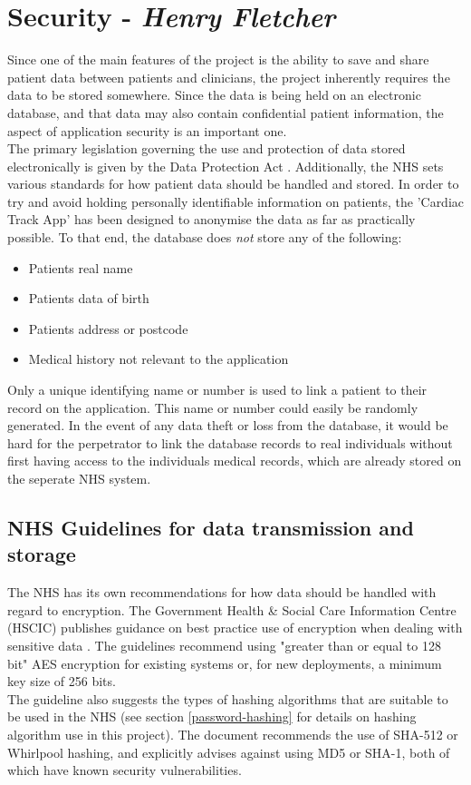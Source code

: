 \documentclass[11pt]{article}
\begin{document}
\section{Security - \textit{Henry Fletcher}} \label{security}

Since one of the main features of the project is the ability to save and share patient data between patients and clinicians, the project inherently requires the data to be stored somewhere. Since the data is being held on an electronic database, and that data may also contain confidential patient information, the aspect of application security is an important one.
\\ \indent
The primary legislation governing the use and protection of data stored electronically is given by the Data Protection Act \cite{ukDPA}. Additionally, the NHS sets various standards for how patient data should be handled and stored. In order to try and avoid holding personally identifiable information on patients, the 'Cardiac Track App' has been designed to anonymise the data as far as practically possible. To that end, the database does \textit{not} store any of the following: 
\begin{itemize}
  \item Patients real name
  \item Patients data of birth
  \item Patients address or postcode
  \item Medical history not relevant to the application
\end{itemize}
Only a unique identifying name or number is used to link a patient to their record on the application. This name or number could easily be randomly generated. In the event of any data theft or loss from the database, it would be hard for the perpetrator to link the database records to real individuals without first having access to the individuals medical records, which are already stored on the seperate NHS system.

\subsection{NHS Guidelines for data transmission and storage} \label{security:nhsguidelines}
The NHS  has its own recommendations for how data should be handled with regard to encryption. The Government Health \& Social Care Information Centre (HSCIC) publishes guidance on best practice use of encryption when dealing with sensitive data \cite{NHS:hsic:acs}. The guidelines recommend using "greater than or equal to 128 bit" AES encryption for existing systems or, for new deployments, a minimum key size of 256 bits. 
\\ \indent
The guideline also suggests the types of hashing algorithms that are suitable to be used in the NHS (see section \ref{password-hashing} for details on hashing algorithm use in this project). The document recommends the use of SHA-512 or Whirlpool hashing, and explicitly advises against using MD5 or SHA-1, both of which have known security vulnerabilities.
\end{document}
